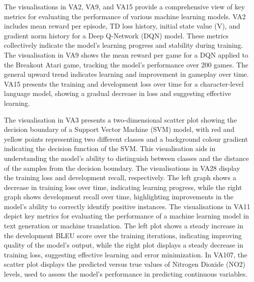 The visualisations in VA2, VA9, and VA15 provide a comprehensive view of key metrics for evaluating the performance of various machine learning models. VA2 includes mean reward per episode, TD loss history, initial state value (V), and gradient norm history for a Deep Q-Network (DQN) model. These metrics collectively indicate the model's learning progress and stability during training. The visualisation in VA9 shows the mean reward per game for a DQN applied to the Breakout Atari game, tracking the model's performance over 200 games. The general upward trend indicates learning and improvement in gameplay over time. VA15 presents the training and development loss over time for a character-level language model, showing a gradual decrease in loss and suggesting effective learning.

The visualisation in VA3 presents a two-dimensional scatter plot showing the decision boundary of a Support Vector Machine (SVM) model, with red and yellow points representing two different classes and a background colour gradient indicating the decision function of the SVM. This visualisation aids in understanding the model's ability to distinguish between classes and the distance of the samples from the decision boundary. The visualisations in VA28 display the training loss and development recall, respectively. The left graph shows a decrease in training loss over time, indicating learning progress, while the right graph shows development recall over time, highlighting improvements in the model's ability to correctly identify positive instances. The visualisations in VA11 depict key metrics for evaluating the performance of a machine learning model in text generation or machine translation. The left plot shows a steady increase in the development BLEU score over the training iterations, indicating improving quality of the model's output, while the right plot displays a steady decrease in training loss, suggesting effective learning and error minimization. In VA107, the scatter plot displays the predicted versus true values of Nitrogen Dioxide (NO2) levels, used to assess the model's performance in predicting continuous variables.

